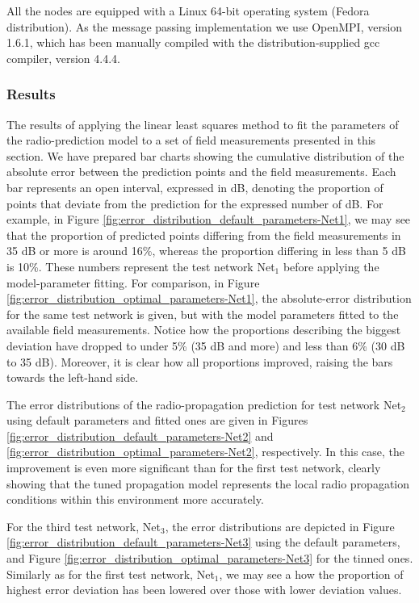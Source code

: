 All the nodes are equipped with a Linux 64-bit operating system (Fedora
distribution). As the message passing implementation we use OpenMPI,
version 1.6.1, which has been manually compiled with the distribution-supplied
gcc compiler, version 4.4.4.


\subsubsection{Results \label{sub:Optimization-results}}

The results of applying the linear least squares method to fit the
parameters of the radio-prediction model to a set of field measurements
presented in this section. We have prepared bar charts showing the
cumulative distribution of the absolute error between the prediction
points and the field measurements. Each bar represents an open interval,
expressed in dB, denoting the proportion of points that deviate from
the prediction for the expressed number of dB. For example, in Figure
\ref{fig:error_distribution_default_parameters-Net1}, we may see
that the proportion of predicted points differing from the field measurements
in 35 dB or more is around 16\%, whereas the proportion differing
in less than 5 dB is 10\%. These numbers represent the test network
Net$_{1}$ before applying the model-parameter fitting. For comparison,
in Figure \ref{fig:error_distribution_optimal_parameters-Net1}, the
absolute-error distribution for the same test network is given, but
with the model parameters fitted to the available field measurements.
Notice how the proportions describing the biggest deviation have dropped
to under 5\% (35 dB and more) and less than 6\% (30 dB to 35 dB).
Moreover, it is clear how all proportions improved, raising the bars
towards the left-hand side.

The error distributions of the radio-propagation prediction for test
network Net$_{2}$ using default parameters and fitted ones are given
in Figures \ref{fig:error_distribution_default_parameters-Net2} and
\ref{fig:error_distribution_optimal_parameters-Net2}, respectively.
In this case, the improvement is even more significant than for the
first test network, clearly showing that the tuned propagation model
represents the local radio propagation conditions within this environment
more accurately.

For the third test network, Net$_{3}$, the error distributions are
depicted in Figure \ref{fig:error_distribution_default_parameters-Net3}
using the default parameters, and Figure \ref{fig:error_distribution_optimal_parameters-Net3}
for the tinned ones. Similarly as for the first test network, Net$_{1}$,
we may see a how the proportion of highest error deviation has been
lowered over those with lower deviation values. 


